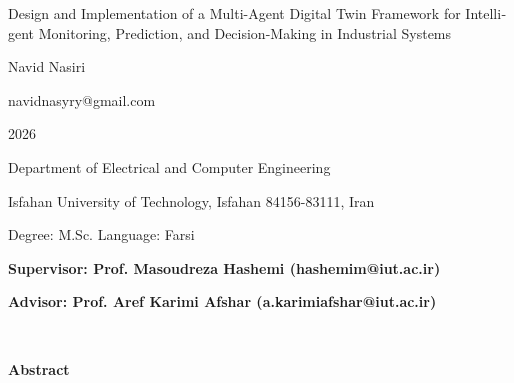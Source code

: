 \thispagestyle{empty}

\begin{latin}
\begin{center}

{\huge Design and Implementation of a Multi-Agent Digital Twin Framework for Intelligent Monitoring, Prediction, and Decision-Making in Industrial Systems}

\vspace{1cm}

{\LARGE{Navid Nasiri}}

\vspace{0.2cm}

{\small navidnasyry@gmail.com}

\vspace{0.5cm}

2026

\vspace{0.5cm}

Department of Electrical and Computer Engineering

\vspace{0.2cm}

Isfahan University of Technology, Isfahan 84156-83111, Iran

\vspace{0.2cm}

Degree: M.Sc. \hspace*{3cm} Language: Farsi

\vspace{1cm}

{\small\textbf{Supervisor: Prof. Masoudreza Hashemi (hashemim@iut.ac.ir)}}

{\small\textbf{Advisor: Prof. Aref Karimi Afshar (a.karimiafshar@iut.ac.ir)}}
\end{center}
~\vfill


\noindent\textbf{Abstract}

\begin{small}
\baselineskip=0.6cm


\end{small}
\end{latin}
